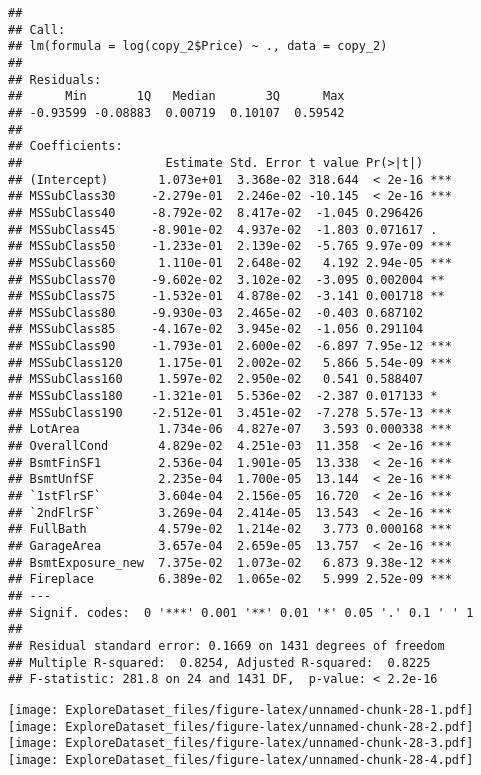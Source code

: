 \documentclass[]{article}
\begin{document}
\begin{verbatim}
## 
## Call:
## lm(formula = log(copy_2$Price) ~ ., data = copy_2)
## 
## Residuals:
##      Min       1Q   Median       3Q      Max 
## -0.93599 -0.08883  0.00719  0.10107  0.59542 
## 
## Coefficients:
##                    Estimate Std. Error t value Pr(>|t|)    
## (Intercept)       1.073e+01  3.368e-02 318.644  < 2e-16 ***
## MSSubClass30     -2.279e-01  2.246e-02 -10.145  < 2e-16 ***
## MSSubClass40     -8.792e-02  8.417e-02  -1.045 0.296426    
## MSSubClass45     -8.901e-02  4.937e-02  -1.803 0.071617 .  
## MSSubClass50     -1.233e-01  2.139e-02  -5.765 9.97e-09 ***
## MSSubClass60      1.110e-01  2.648e-02   4.192 2.94e-05 ***
## MSSubClass70     -9.602e-02  3.102e-02  -3.095 0.002004 ** 
## MSSubClass75     -1.532e-01  4.878e-02  -3.141 0.001718 ** 
## MSSubClass80     -9.930e-03  2.465e-02  -0.403 0.687102    
## MSSubClass85     -4.167e-02  3.945e-02  -1.056 0.291104    
## MSSubClass90     -1.793e-01  2.600e-02  -6.897 7.95e-12 ***
## MSSubClass120     1.175e-01  2.002e-02   5.866 5.54e-09 ***
## MSSubClass160     1.597e-02  2.950e-02   0.541 0.588407    
## MSSubClass180    -1.321e-01  5.536e-02  -2.387 0.017133 *  
## MSSubClass190    -2.512e-01  3.451e-02  -7.278 5.57e-13 ***
## LotArea           1.734e-06  4.827e-07   3.593 0.000338 ***
## OverallCond       4.829e-02  4.251e-03  11.358  < 2e-16 ***
## BsmtFinSF1        2.536e-04  1.901e-05  13.338  < 2e-16 ***
## BsmtUnfSF         2.235e-04  1.700e-05  13.144  < 2e-16 ***
## `1stFlrSF`        3.604e-04  2.156e-05  16.720  < 2e-16 ***
## `2ndFlrSF`        3.269e-04  2.414e-05  13.543  < 2e-16 ***
## FullBath          4.579e-02  1.214e-02   3.773 0.000168 ***
## GarageArea        3.657e-04  2.659e-05  13.757  < 2e-16 ***
## BsmtExposure_new  7.375e-02  1.073e-02   6.873 9.38e-12 ***
## Fireplace         6.389e-02  1.065e-02   5.999 2.52e-09 ***
## ---
## Signif. codes:  0 '***' 0.001 '**' 0.01 '*' 0.05 '.' 0.1 ' ' 1
## 
## Residual standard error: 0.1669 on 1431 degrees of freedom
## Multiple R-squared:  0.8254, Adjusted R-squared:  0.8225 
## F-statistic: 281.8 on 24 and 1431 DF,  p-value: < 2.2e-16
\end{verbatim}

\texttt{[image: ExploreDataset\_files/figure-latex/unnamed-chunk-28-1.pdf]}
\texttt{[image: ExploreDataset\_files/figure-latex/unnamed-chunk-28-2.pdf]}
\texttt{[image: ExploreDataset\_files/figure-latex/unnamed-chunk-28-3.pdf]}
\texttt{[image: ExploreDataset\_files/figure-latex/unnamed-chunk-28-4.pdf]}
\end{document}
